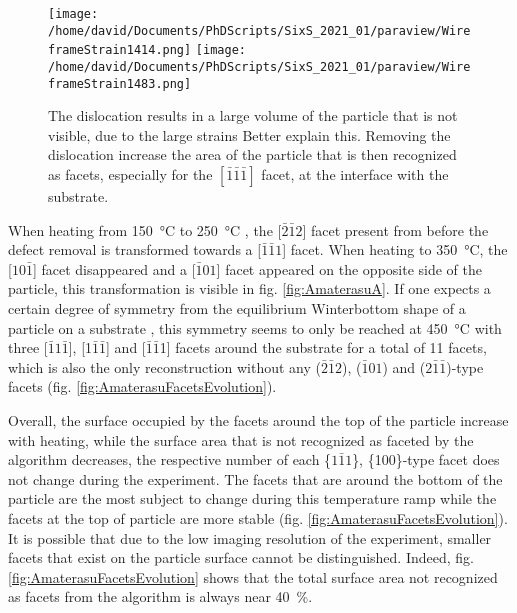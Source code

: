 \begin{figure}[!htb]
    \centering
    \texttt{[image: /home/david/Documents/PhDScripts/SixS\_2021\_01/paraview/WireframeStrain1414.png]}
    \texttt{[image: /home/david/Documents/PhDScripts/SixS\_2021\_01/paraview/WireframeStrain1483.png]}
    \caption{
        The dislocation results in a large volume of the particle that is not visible, due to the large strains \textcolor{Important}{Better explain this}.
        Removing the dislocation increase the area of the particle that is then recognized as facets, especially for the $[\bar{1}\bar{1}\bar{1}]$ facet, at the interface with the substrate.
    }
    \label{fig:AmaterasuDefect}
\end{figure}

When heating from \qty{150}{\degreeCelsius} to \qty{250}{\degreeCelsius} , the [$\bar{2}\bar{1}2$] facet present from before the defect removal is transformed towards a [$\bar{1}\bar{1}1$] facet.
When heating to \qty{350}{\degreeCelsius}, the [$10\bar{1}$] facet disappeared and a [$\bar{1}01$] facet appeared on the opposite side of the particle, this transformation is visible in fig. \ref{fig:AmaterasuA}.
If one expects a certain degree of symmetry from the equilibrium Winterbottom shape of a particle on a substrate \parencite{WINTERBOTTOM1967, Boukouvala2021}, this symmetry seems to only be reached at \qty{450}{\degreeCelsius} with three [$\bar{1}1\bar{1}$], [1$\bar{1}\bar{1}$] and [$\bar{1}\bar{1}$1] facets around the substrate for a total of 11 facets, which is also the only reconstruction without any ($\bar{2}\bar{1}2$), ($\bar{1}01$) and ($2\bar{1}\bar{1}$)-type facets (fig. \ref{fig:AmaterasuFacetsEvolution}).

Overall, the surface occupied by the facets around the top of the particle increase with heating, while the surface area that is not recognized as faceted by the algorithm decreases, the respective number of each \{$1\bar{1}1$\}, \{100\}-type facet does not change during the experiment.
The facets that are around the bottom of the particle are the most subject to change during this temperature ramp while the facets at the top of particle are more stable (fig. \ref{fig:AmaterasuFacetsEvolution}).
It is possible that due to the low imaging resolution of the experiment, smaller facets that exist on the particle surface cannot be distinguished.
Indeed, fig. \ref{fig:AmaterasuFacetsEvolution} shows that the total surface area not recognized as facets from the algorithm is always near \qty{40}{\percent}.

